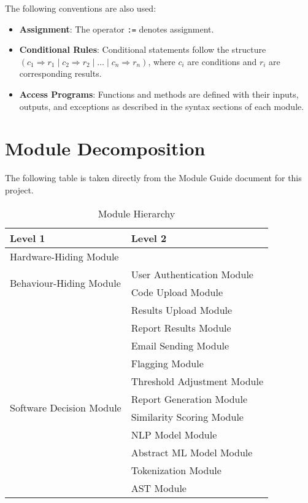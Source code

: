 \documentclass[12pt, titlepage]{article}
\begin{document}
\noindent
The following conventions are also used:
\begin{itemize}
    \item \textbf{Assignment}: The operator \texttt{:=} denotes assignment.
    \item \textbf{Conditional Rules}: Conditional statements follow the structure $(c_1 \Rightarrow r_1 \mid c_2 \Rightarrow r_2 \mid \ldots \mid c_n \Rightarrow r_n)$, where $c_i$ are conditions and $r_i$ are corresponding results.
    \item \textbf{Access Programs}: Functions and methods are defined with their inputs, outputs, and exceptions as described in the syntax sections of each module.
\end{itemize}

\section{Module Decomposition}

The following table is taken directly from the Module Guide document for this project.

\begin{table}[h!]
    \centering
    \begin{tabular}{p{} p{}}
    \toprule
    \textbf{Level 1} & \textbf{Level 2} \\
    \midrule
    {Hardware-Hiding Module} & ~ \\
    \midrule
    \multirow{2}{*}{Behaviour-Hiding Module} 
    & User Authentication Module \\
    & Code Upload Module \\
    & Results Upload Module \\
    & Report Results Module \\
    & Email Sending Module \\
    & Flagging Module \\
    & Threshold Adjustment Module \\
    \midrule
    \multirow{2}{*}{Software Decision Module} 
    & Report Generation Module \\
    & Similarity Scoring Module \\
    & NLP Model Module \\
    & Abstract ML Model Module \\
    & Tokenization Module \\
    & AST Module \\
   
    \bottomrule
    \end{tabular}
    \caption{Module Hierarchy}
    \label{TblMH}
  \end{table}
\newpage
~\newpage
\end{document}
